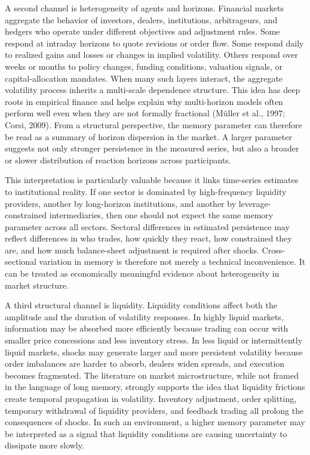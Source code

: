 \documentclass[12pt]{article}
\begin{document}
A second channel is heterogeneity of agents and horizons. Financial markets aggregate the behavior of investors, dealers, institutions, arbitrageurs, and hedgers who operate under different objectives and adjustment rules. Some respond at intraday horizons to quote revisions or order flow. Some respond daily to realized gains and losses or changes in implied volatility. Others respond over weeks or months to policy changes, funding conditions, valuation signals, or capital-allocation mandates. When many such layers interact, the aggregate volatility process inherits a multi-scale dependence structure. This idea has deep roots in empirical finance and helps explain why multi-horizon models often perform well even when they are not formally fractional (M\"uller et al., 1997; Corsi, 2009). From a structural perspective, the memory parameter can therefore be read as a summary of horizon dispersion in the market. A larger parameter suggests not only stronger persistence in the measured series, but also a broader or slower distribution of reaction horizons across participants.

This interpretation is particularly valuable because it links time-series estimates to institutional reality. If one sector is dominated by high-frequency liquidity providers, another by long-horizon institutions, and another by leverage-constrained intermediaries, then one should not expect the same memory parameter across all sectors. Sectoral differences in estimated persistence may reflect differences in who trades, how quickly they react, how constrained they are, and how much balance-sheet adjustment is required after shocks. Cross-sectional variation in memory is therefore not merely a technical inconvenience. It can be treated as economically meaningful evidence about heterogeneity in market structure.

A third structural channel is liquidity. Liquidity conditions affect both the amplitude and the duration of volatility responses. In highly liquid markets, information may be absorbed more efficiently because trading can occur with smaller price concessions and less inventory stress. In less liquid or intermittently liquid markets, shocks may generate larger and more persistent volatility because order imbalances are harder to absorb, dealers widen spreads, and execution becomes fragmented. The literature on market microstructure, while not framed in the language of long memory, strongly supports the idea that liquidity frictions create temporal propagation in volatility. Inventory adjustment, order splitting, temporary withdrawal of liquidity providers, and feedback trading all prolong the consequences of shocks. In such an environment, a higher memory parameter may be interpreted as a signal that liquidity conditions are causing uncertainty to dissipate more slowly.
\end{document}
